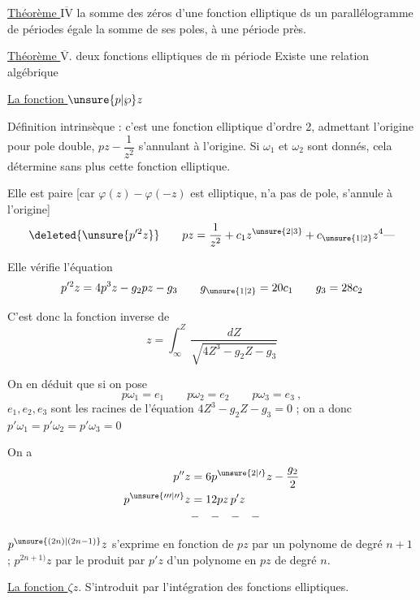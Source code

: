\uline{Théorème $\overline{\mathrm{IV}}$} la somme des zéros d'une fonction  elliptique ds un parallélogramme de périodes égale la somme de ses poles, à une période près.

\uline{Théorème $\overline{\mathrm V}$}.  deux fonctions elliptiques de $\overline{\mathrm m}$ période Existe une relation algébrique

\uline{La fonction $\unsure{p|\wp}z$}

Définition intrinsèque : c'est une fonction elliptique d'ordre 2, admettant l'origine pour pole double,   $pz-\dfrac{1}{z^2}$ s'annulant à l'origine. Si $\omega_1$ et $\omega_2$ sont donnés, cela détermine sans plus cette fonction elliptique.

Elle est paire [car $\varphi(z)-\varphi(-z)$ est elliptique, n'a pas de pole, s'annule à l'origine]  
\[
\deleted{\unsure{p^{\prime2}z}}\qquad
pz=\frac1{z^2}+c_1z^{\unsure{2|3}}+c_{\unsure{1|2}}z^4\mathord{\text{---}}
\]

Elle vérifie l'équation
\[
p^{\prime 2}z=4p^3z-g_2pz-g_3\qquad
g_{\unsure{1|2}}=20c_1\qquad g_3=28c_2
\]

C'est donc la fonction inverse de
\[
z=\int_\infty^Z\frac{dZ}{\sqrt{4Z^3-g_2Z-g_3}}
\]

On en déduit que si on pose
\[
p\omega_1=e_1\qquad p\omega_2=e_2\qquad p\omega_3=e_3\ ,
\]
$e_1,e_2,e_3$ sont les racines de l'équation $4Z^3-g_2Z-g_3=0$ ; on a donc $p'\omega_1=p'\omega_2=p'\omega_3=0$

On a 
\[
\begin{aligned}
p''z&=6p^{\unsure{2|\prime}}z-\frac{g_2}{2}\\
p^{\unsure{\prime\prime\prime|\prime\prime}}z&=12pz\,p'z\\
&\mathord{-}\quad\mathord{-}\quad\mathord{-}\quad\mathord{-}
\end{aligned}
\]

$p^{\unsure{(2n)|(2n-1)}}z$ s'exprime en fonction de $pz$ par un polynome de degré $n+1$ ; $p^{2n+1)}z$ par le produit par $p'z$ d'un polynome en $pz$ de degré $n$.


\uline{La fonction $\zeta z$}. S'introduit par l'intégration des fonctions elliptiques.

